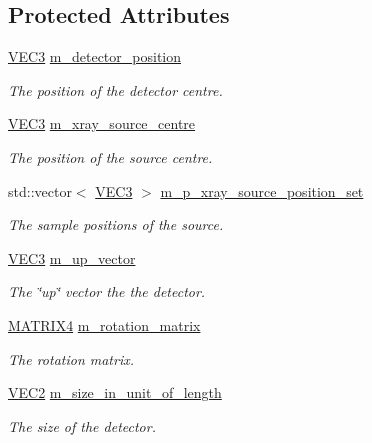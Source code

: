 \subsection*{Protected Attributes}
\begin{DoxyCompactItemize}
\item 
\hyperlink{class_math_1_1_vec3}{VEC3} \hyperlink{classg_virtual_x_ray_1_1_x_ray_detector_af60ca47a7687066d3c474146a4a9f85a}{m\_\-detector\_\-position}
\begin{DoxyCompactList}\small\item\em The position of the detector centre. \end{DoxyCompactList}\item 
\hyperlink{class_math_1_1_vec3}{VEC3} \hyperlink{classg_virtual_x_ray_1_1_x_ray_detector_abc32b66cca7b4e14d3ddce4fcd31c497}{m\_\-xray\_\-source\_\-centre}
\begin{DoxyCompactList}\small\item\em The position of the source centre. \end{DoxyCompactList}\item 
std::vector$<$ \hyperlink{class_math_1_1_vec3}{VEC3} $>$ \hyperlink{classg_virtual_x_ray_1_1_x_ray_detector_a2669db81b788d9bf9e3f91ffc7a385d5}{m\_\-p\_\-xray\_\-source\_\-position\_\-set}
\begin{DoxyCompactList}\small\item\em The sample positions of the source. \end{DoxyCompactList}\item 
\hyperlink{class_math_1_1_vec3}{VEC3} \hyperlink{classg_virtual_x_ray_1_1_x_ray_detector_ac03caffd75f0386f2dda388c2c38b782}{m\_\-up\_\-vector}
\begin{DoxyCompactList}\small\item\em The \char`\"{}up\char`\"{} vector the the detector. \end{DoxyCompactList}\item 
\hyperlink{class_math_1_1_matrix4x4}{MATRIX4} \hyperlink{classg_virtual_x_ray_1_1_x_ray_detector_a939ddb2d6fb51e831236ee0ccffc7ec8}{m\_\-rotation\_\-matrix}
\begin{DoxyCompactList}\small\item\em The rotation matrix. \end{DoxyCompactList}\item 
\hyperlink{class_math_1_1_vec2}{VEC2} \hyperlink{classg_virtual_x_ray_1_1_x_ray_detector_a742613089e3a523792c5b253020d7d98}{m\_\-size\_\-in\_\-unit\_\-of\_\-length}
\begin{DoxyCompactList}\small\item\em The size of the detector. \end{DoxyCompactList}\item 

\end{DoxyCompactItemize}
